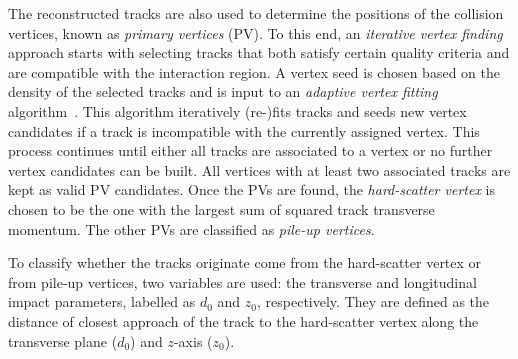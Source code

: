 
The reconstructed tracks are also used to determine the positions of the collision vertices, known as \emph{primary vertices} (PV). To this end, an \emph{iterative vertex finding} approach \cite{PERF-2015-01} starts with selecting tracks that both satisfy certain quality criteria and are compatible with the interaction region. A vertex seed is chosen based on the density of the selected tracks and is input to an \emph{adaptive vertex fitting} algorithm~\cite{0954-3899-34-12-N01}.
This algorithm iteratively (re-)fits tracks and seeds new vertex candidates if a track is incompatible with the currently assigned vertex.
This process continues until either all tracks are associated to a vertex or no further vertex candidates can be built.
All vertices with at least two associated tracks are kept as valid PV candidates.
Once the PVs are found, the \emph{hard-scatter vertex} is chosen to be the one with the largest sum of squared track transverse momentum. The other PVs are classified as \emph{pile-up vertices}.

To classify whether the tracks originate come from the hard-scatter vertex or from pile-up vertices, two variables are used: the transverse and longitudinal impact parameters, labelled as $d_0$ and $z_0$, respectively. They are defined as the distance of closest approach of the track to the hard-scatter vertex along the transverse plane ($d_0$) and $z$-axis ($z_0$).


